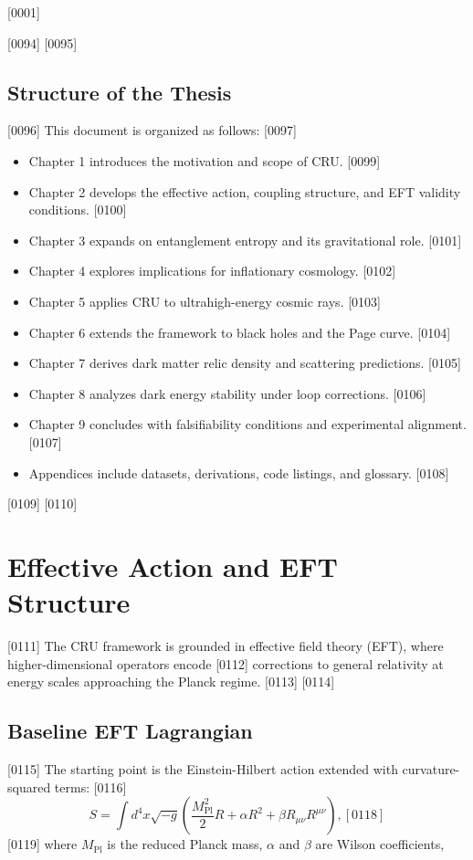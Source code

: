 [0001] \documentclass[12pt]{report}
[0002] \usepackage[utf8]{inputenc}
\begin{document}
[0094] 
[0095] \section{Structure of the Thesis}
[0096] This document is organized as follows:
[0097] \begin{itemize}
[0098]   \item Chapter 1 introduces the motivation and scope of CRU.
[0099]   \item Chapter 2 develops the effective action, coupling structure, and EFT validity conditions.
[0100]   \item Chapter 3 expands on entanglement entropy and its gravitational role.
[0101]   \item Chapter 4 explores implications for inflationary cosmology.
[0102]   \item Chapter 5 applies CRU to ultrahigh-energy cosmic rays.
[0103]   \item Chapter 6 extends the framework to black holes and the Page curve.
[0104]   \item Chapter 7 derives dark matter relic density and scattering predictions.
[0105]   \item Chapter 8 analyzes dark energy stability under loop corrections.
[0106]   \item Chapter 9 concludes with falsifiability conditions and experimental alignment.
[0107]   \item Appendices include datasets, derivations, code listings, and glossary.
[0108] \end{itemize}
[0109] 
[0110] \chapter{Effective Action and EFT Structure}
[0111] The CRU framework is grounded in effective field theory (EFT), where higher-dimensional operators encode 
[0112] corrections to general relativity at energy scales approaching the Planck regime. 
[0113] 
[0114] \section{Baseline EFT Lagrangian}
[0115] The starting point is the Einstein-Hilbert action extended with curvature-squared terms:
[0116] \begin{equation}
[0117] S = \int d^4x \sqrt{-g} \left( \frac{M_{\text{Pl}}^2}{2} R + \alpha R^2 + \beta R_{\mu\nu}R^{\mu\nu} \right),
[0118] \end{equation}
[0119] where $M_{\text{Pl}}$ is the reduced Planck mass, $\alpha$ and $\beta$ are Wilson coefficients, 
\end{document}
